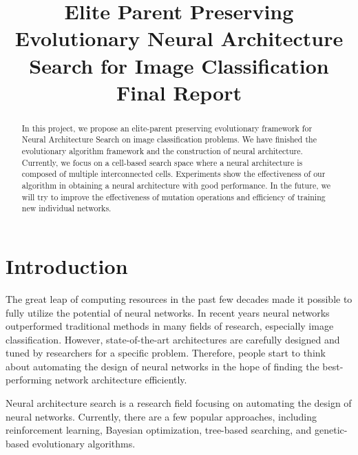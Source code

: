 \documentclass[conference]{IEEEtran}
\begin{document}
\title{Elite Parent Preserving Evolutionary Neural Architecture Search for Image Classification \\ Final Report}

\author{
}

\maketitle

\begin{abstract}
In this project, we propose an elite-parent preserving evolutionary framework for Neural Architecture Search on image classification problems. We have finished the evolutionary algorithm framework and the construction of neural architecture. Currently, we focus on a cell-based search space where a neural architecture is composed of multiple interconnected cells. Experiments show the effectiveness of our algorithm in obtaining a neural architecture with good performance. In the future, we will try to improve the effectiveness of mutation operations and efficiency of training new individual networks.

\end{abstract}
\IEEEpeerreviewmaketitle

\section{Introduction}
    The great leap of computing resources in the past few decades made it possible to fully utilize the potential of neural networks. In recent years neural networks outperformed traditional methods in many fields of research, especially image classification. However, state-of-the-art architectures are carefully designed and tuned by researchers for a specific problem. Therefore, people start to think about automating the design of neural networks in the hope of finding the best-performing network architecture efficiently.

    Neural architecture search is a research field focusing on automating the design of neural networks. Currently, there are a few popular approaches, including reinforcement learning, Bayesian optimization, tree-based searching, and genetic-based evolutionary algorithms. 
\end{document}
